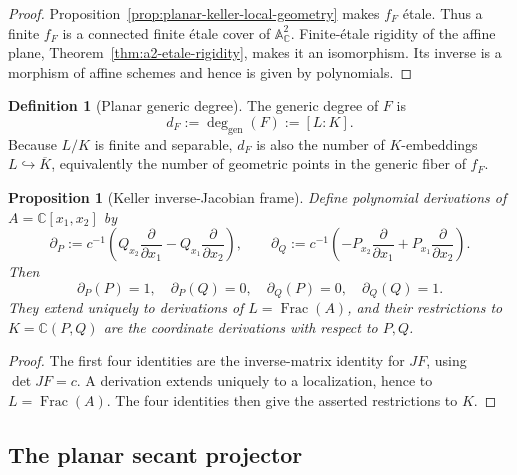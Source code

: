 \documentclass[11pt]{article}
\newtheorem{proposition}[theorem]{Proposition}
\theoremstyle{remark}
\theoremstyle{definition}
\newtheorem{definition}[theorem]{Definition}
\DeclareMathOperator{\Frac}{Frac}
\newcommand{\A}{\mathbb A}
\newcommand{\C}{\mathbb C}
\begin{document}
\begin{proof}
Proposition~\ref{prop:planar-keller-local-geometry} makes \(f_F\) \'etale.
Thus a finite \(f_F\) is a connected finite \'etale cover of
\(\A^2_{\C}\).  Finite-\'etale rigidity of the affine plane,
Theorem~\ref{thm:a2-etale-rigidity}, makes it an isomorphism.  Its inverse
is a morphism of affine schemes and hence is given by polynomials.
\end{proof}

\begin{definition}[Planar generic degree]
\label{def:planar-generic-degree}
The generic degree of \(F\) is
\[
  d_F:=\deg_{\mathrm{gen}}(F):=[L:K].
\]
Because \(L/K\) is finite and separable, \(d_F\) is also the number of
\(K\)-embeddings \(L\hookrightarrow\overline K\), equivalently the number
of geometric points in the generic fiber of \(f_F\).
\end{definition}

\begin{proposition}[Keller inverse-Jacobian frame]
\label{prop:keller-inverse-jacobian-frame}
Define polynomial derivations of \(A=\C[x_1,x_2]\) by
\[
  \partial_P
  :=c^{-1}\left(
      Q_{x_2}\frac{\partial}{\partial x_1}
      -Q_{x_1}\frac{\partial}{\partial x_2}\right),
  \qquad
  \partial_Q
  :=c^{-1}\left(
      -P_{x_2}\frac{\partial}{\partial x_1}
      +P_{x_1}\frac{\partial}{\partial x_2}\right).
\]
Then
\[
  \partial_P(P)=1,
  \quad \partial_P(Q)=0,
  \quad \partial_Q(P)=0,
  \quad \partial_Q(Q)=1.
\]
They extend uniquely to derivations of \(L=\Frac(A)\), and their
restrictions to \(K=\C(P,Q)\) are the coordinate derivations with respect
to \(P,Q\).
\end{proposition}

\begin{proof}
The first four identities are the inverse-matrix identity for \(JF\), using
\(\det JF=c\).  A derivation extends uniquely to a localization, hence to
\(L=\Frac(A)\).  The four identities then give the asserted restrictions
to \(K\).
\end{proof}

\subsection{The planar secant projector}
\end{document}
